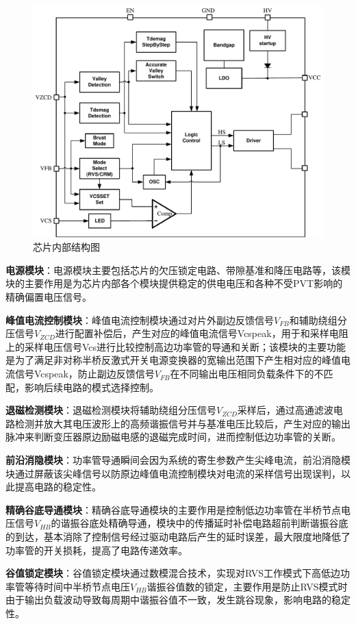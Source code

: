 \begin{figure}[htbp] 
    \centering
    \includegraphics[width=0.8\linewidth]{figures/芯片内部结构图.pdf}
    \caption{芯片内部结构图}
    \label{fig:芯片内部结构图}
\end{figure}

\textbf{电源模块}：电源模块主要包括芯片的欠压锁定电路、带隙基准和降压电路等，该模块的主要作用是为芯片内部各个模块提供稳定的供电电压和各种不受PVT影响的精确偏置电压信号。

\textbf{峰值电流控制模块}：峰值电流控制模块通过对片外副边反馈信号$V_{FB}$和辅助绕组分压信号$V_{ZCD}$进行配置补偿后，产生对应的峰值电流信号Vcspeak，用于和采样电阻上的采样电压信号Vcs进行比较控制高边功率管的导通和关断；该模块的主要功能是为了满足非对称半桥反激式开关电源变换器的宽输出范围下产生相对应的峰值电流信号Vcspeak，防止副边反馈信号$V_{FB}$在不同输出电压相同负载条件下的不匹配，影响后续电路的模式选择控制。

\textbf{退磁检测模块}：退磁检测模块将辅助绕组分压信号$V_{ZCD}$采样后，通过高通滤波电路检测并放大其电压波形上的高频谐振信号并与基准电压比较后，产生对应的输出脉冲来判断变压器原边励磁电感的退磁完成时间，进而控制低边功率管的关断。

\textbf{前沿消隐模块}：功率管导通瞬间会因为系统的寄生参数产生尖峰电流，前沿消隐模块通过屏蔽该尖峰信号以防原边峰值电流控制模块对电流的采样信号出现误判，以此提高电路的稳定性。

\textbf{精确谷底导通模块}：精确谷底导通模块的主要作用是控制低边功率管在半桥节点电压信号$V_{HB}$的谐振谷底处精确导通，模块中的传播延时补偿电路超前判断谐振谷底的到达，基本消除了控制信号经过驱动电路后产生的延时误差，最大限度地降低了功率管的开关损耗，提高了电路传递效率。

\textbf{谷值锁定模块}：谷值锁定模块通过数模混合技术，实现对RVS工作模式下高低边功率管等待时间中半桥节点电压$V_{HB}$谐振谷值数的锁定，主要作用是防止RVS模式时由于输出负载波动导致每周期中谐振谷值不一致，发生跳谷现象，影响电路的稳定性。

